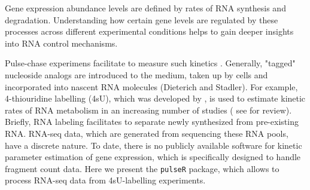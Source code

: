Gene expression abundance levels are defined by rates of RNA synthesis and degradation.
Understanding how certain gene levels are regulated by these processes across different
experimental conditions helps to gain deeper insights into RNA control mechanisms.
\par
Pulse-chase experimens facilitate to measure such kinetics \citep{wachutka2016measures}. 
Generally, "tagged" nucleoside analogs are introduced to the medium, 
taken up by cells and incorporated into nascent RNA molecules (Dieterich and Stadler).
For example, 4-thiouridine labelling (4sU), which was developed by \cite{dolken2008high}, is used to estimate 
kinetic rates of RNA metabolism in an increasing number of studies ( 
see \cite{wachutka2016measures} for review). Briefly, RNA labeling facilitates to separate newly synthesized from pre-existing RNA.
RNA-seq data, which are generated from sequencing these RNA pools, have a discrete nature.
To date, there is no publicly available software for kinetic parameter estimation of gene expression, which is specifically designed to handle 
fragment count data. Here we present the \verb|pulseR| package, which allows to 
process RNA-seq data from 4sU-labelling experiments.
